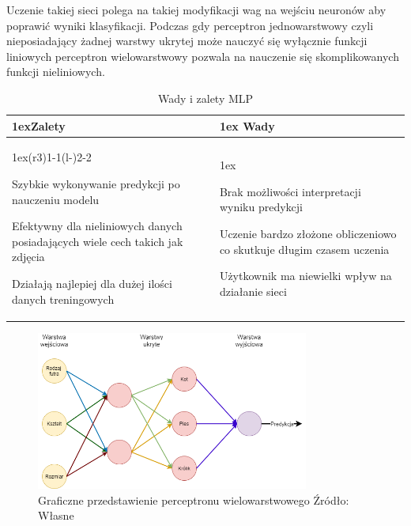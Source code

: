 Uczenie takiej sieci polega na takiej modyfikacji wag na wejściu neuronów aby poprawić
wyniki klasyfikacji. Podczas gdy perceptron jednowarstwowy czyli nieposiadający żadnej warstwy ukrytej może 
nauczyć się wyłącznie funkcji liniowych perceptron wielowarstwowy pozwala na nauczenie
się skomplikowanych funkcji nieliniowych.

\begin{table}[h]
    \begin{tabularx}{\linewidth}{>{\parskip1ex}X@{\kern4\tabcolsep}>{\parskip1ex}X}
    \toprule
    \hfil\bfseries Zalety
    &
    \hfil\bfseries Wady
    \\\cmidrule(r{3\tabcolsep}){1-1}\cmidrule(l{-\tabcolsep}){2-2}
    
    Szybkie wykonywanie predykcji po nauczeniu modelu\par
    Efektywny dla nieliniowych danych posiadających wiele cech takich jak zdjęcia\par
    Działają najlepiej dla dużej ilości danych treningowych\par
    &
    
    Brak możliwości interpretacji wyniku predykcji\par
    Uczenie bardzo złożone obliczeniowo co skutkuje długim czasem uczenia\par
    Użytkownik ma niewielki wpływ na działanie sieci\par
    \\\bottomrule
    \end{tabularx}
    \caption{Wady i zalety MLP}
\end{table}

\begin{figure}[h]
    \centering
    \includegraphics[width=0.8\textwidth]{./Img/MLP.png}
    \caption{Graficzne przedstawienie perceptronu wielowarstwowego Źródło: Własne}
\end{figure}

